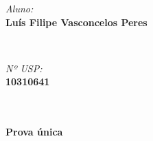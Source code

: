 \begin{minipage}{0.52\textwidth}
\begin{flushleft} \large
\emph{Aluno:}\\
\textbf{Luís Filipe Vasconcelos Peres} %
\end{flushleft}
\end{minipage}
~
\begin{minipage}{0.45\textwidth}
\begin{flushright} \large
\emph{Nº USP:} \\
\textbf{10310641} %
\end{flushright}
\end{minipage}\\

\center
\HRule \\[0.4cm]
{ \LARGE \bfseries Prova única}\\ %
\HRule \\[0.2cm]

\justify
\section{}

    
\appendix
\appendixpage


